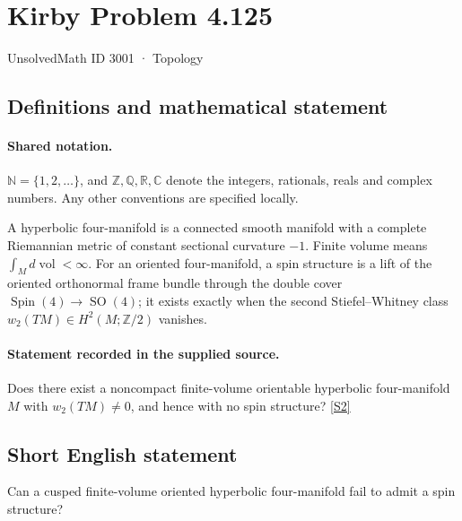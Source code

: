 \documentclass[11pt]{article}
\newcommand{\sref}[2]{\hyperlink{source:#1:#2}{[S#2]}}
\begin{document}
\setcounter{section}{3000}
\section{Kirby Problem 4.125}\label{3001}
{\small\sffamily UnsolvedMath ID 3001 · Topology}
\subsection{Definitions and mathematical statement}

\paragraph{Shared notation.}$\mathbb N=\{1,2,\ldots\}$, and $\mathbb Z,\mathbb Q,\mathbb R,\mathbb C$ denote the integers, rationals, reals and complex numbers. Any other conventions are specified locally.


A hyperbolic four-manifold is a connected smooth manifold with a complete Riemannian metric of constant sectional curvature $-1$. Finite volume means $\int_M d\operatorname{vol}<\infty$. For an oriented four-manifold, a spin structure is a lift of the oriented orthonormal frame bundle through the double cover $\operatorname{Spin}(4)\to\operatorname{SO}(4)$; it exists exactly when the second Stiefel--Whitney class $w_2(TM)\in H^2(M;\mathbb Z/2)$ vanishes.
\paragraph{Statement recorded in the supplied source.}
Does there exist a noncompact finite-volume orientable hyperbolic four-manifold $M$ with $w_2(TM)\ne0$, and hence with no spin structure? \sref{3001}{2}
\subsection{Short English statement}
Can a cusped finite-volume oriented hyperbolic four-manifold fail to admit a spin structure?
\end{document}
